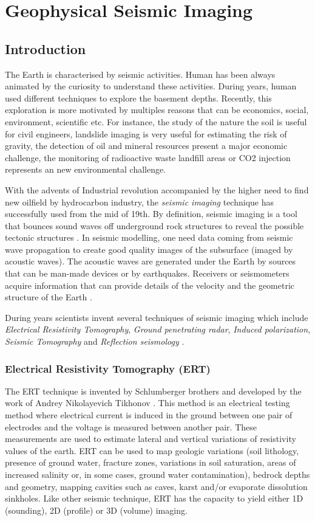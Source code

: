\chapter{Geophysical Seismic Imaging} 

\section{Introduction} 
The Earth is characterised by seismic activities. Human has been always animated by the curiosity to understand these activities. During years, human used different techniques to explore the basement depths. Recently, this exploration is more motivated by multiples reasons that can be economics, social, environment, scientific etc. For instance, the study of the nature the soil is useful for civil engineers, landslide imaging is very useful for estimating the risk of gravity, the detection of oil and mineral resources present a major economic challenge, the monitoring of radioactive waste landfill areas or CO2 injection represents an new environmental challenge.  

With the advents of Industrial revolution accompanied by the higher need to find new oilfield by hydrocarbon industry, the \textit{seismic imaging} technique has successfully used from the mid of 19th. By definition, seismic imaging is a tool that bounces sound waves off underground rock structures to reveal the possible tectonic structures \cite{Reddy2012}. In seismic modelling, one need data coming from seismic wave propagation to create good quality images of the subsurface (imaged by acoustic waves). The acoustic waves are generated under the Earth by sources that can be man-made devices or by earthquakes. Receivers or seismometers acquire information that can provide details of the velocity and the geometric structure of the Earth \cite{Reddy2012}. 


During years scientists invent several techniques of seismic imaging which include \textit{Electrical Resistivity Tomography},  \textit{Ground penetrating radar}, \textit{Induced polarization}, \textit{Seismic Tomography} and \textit{Reflection seismology} \cite{Reddy2012}.

\subsection{Electrical Resistivity Tomography (ERT)} The ERT technique is invented by Schlumberger brothers and developed by the work of Andrey Nikolayevich Tikhonov . This method is an electrical testing method where electrical current is induced in the ground between one pair of electrodes and the voltage is measured between another pair. These measurements are used to estimate lateral and vertical variations of resistivity values of the earth. ERT can be used to map geologic variations (soil lithology, presence of ground water, fracture zones, variations in soil saturation, areas of increased salinity or, in some cases, ground water contamination), bedrock depths and geometry, mapping cavities such as caves, karst and/or evaporate dissolution sinkholes. Like other seismic technique, ERT has the capacity to yield either 1D (sounding), 2D (profile) or 3D (volume) imaging.  

